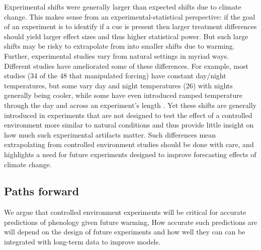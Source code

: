 \documentclass[11pt,letter]{article}
\begin{document}
Experimental shifts were generally larger than expected shifts due to climate change. This makes sense from an experimental-statistical perspective: if the goal of an experiment is to identify if a cue is present then larger treatment differences should yield larger effect sizes and thus higher statistical power. But such large shifts may be risky to extrapolate from into smaller shifts due to warming. Further, experimental studies vary from natural settings in myriad ways. Different studies have ameliorated some of these differences. For example, most studies (34 of the 48 that manipulated forcing) have constant day/night temperatures, but some vary day and night temperatures (26) with nights generally being cooler, while some have even introduced ramped temperature through the day and across an experiment's length \citep[e.g.,][]{Basler:2012,Laube:2014a}. Yet these shifts are generally introduced in experiments that are not designed to test the effect of a controlled environment more similar to natural conditions \citep[but see][]{erwin1995} and thus provide little insight on how much such experimental artifacts matter. Such differences mean extrapolating from controlled environment studies should be done with care, and highlights a need for future experiments designed to improve forecasting effects of climate change. 

\subsection{Paths forward}
We argue that controlled environment experiments will be critical for accurate predictions of phenology given future warming, How accurate such predictions are will depend on the design of future experiments and how well they can can be integrated with long-term data to improve models. 
\end{document}

